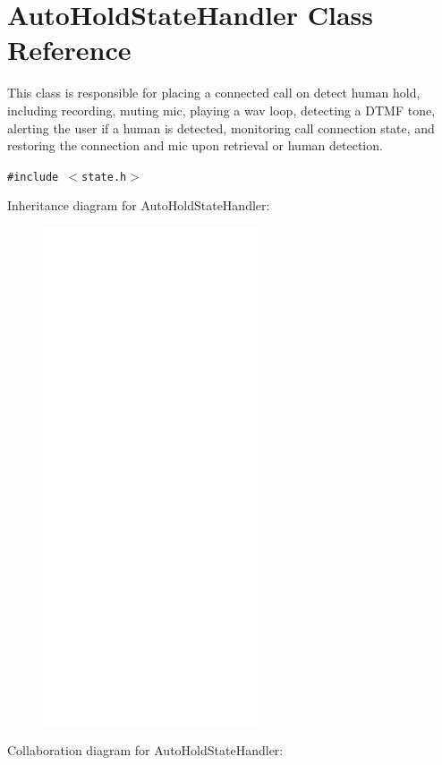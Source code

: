 \hypertarget{classAutoHoldStateHandler}{
\section{AutoHoldStateHandler Class Reference}
\label{classAutoHoldStateHandler}
}
This class is responsible for placing a connected call on detect human hold, including recording, muting mic, playing a wav loop, detecting a DTMF tone, alerting the user if a human is detected, monitoring call connection state, and restoring the connection and mic upon retrieval or human detection.  


{\tt \#include $<$state.h$>$}

Inheritance diagram for AutoHoldStateHandler:\nopagebreak
\begin{figure}[H]
\begin{center}
\leavevmode
\includegraphics[width=182pt]{classAutoHoldStateHandler__inherit__graph}
\end{center}
\end{figure}
Collaboration diagram for AutoHoldStateHandler:\nopagebreak
